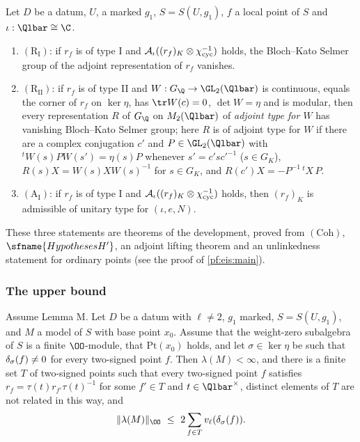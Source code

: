 \begin{definition}\label{pf:eis:rigstmts}
Let $D$ be a datum, $U$, a marked $g_1$, $S=S(U,g_1)$, $f$ a local point of $S$ and $\iota:\Qlbar\cong\C$.
\begin{enumerate}[label=(\alph*)]
\item $(\mathrm{R}_{\mathrm{I}})$: if $r_f$ is of type I and $\mathcal A_\iota((r_f)_K\otimes\chi_{\mathrm{cyc}}^{-1})$ holds, the Bloch--Kato Selmer group of
  the adjoint representation of $r_f$ vanishes.
\item $(\mathrm{R}_{\mathrm{II}})$: if $r_f$ is of type II and $W:G_\Q\to\GL_2(\Qlbar)$ is continuous, equals the corner of $r_f$ on
  $\ker\eta$, has $\tr W(c)=0$, $\det W=\eta$ and is modular, then every representation $R$ of $G_\Q$ on $M_2(\Qlbar)$ of
  \emph{adjoint type for $W$} has vanishing Bloch--Kato Selmer group; here $R$ is of adjoint type for $W$ if there are a
  complex conjugation $c'$ and $P\in\GL_2(\Qlbar)$ with ${}^tW(s)PW(s')=\eta(s)P$ whenever $s'=c'sc'^{-1}$ ($s\in G_K$),
  $R(s)X=W(s)XW(s)^{-1}$ for $s\in G_K$, and $R(c')X=-P^{-1}\,{}^tX\,P$.
\item $(\mathrm{A}_{\mathrm{I}})$: if $r_f$ is of type I and $\mathcal A_\iota((r_f)_K\otimes\chi_{\mathrm{cyc}}^{-1})$ holds, then $(r_f)_K$ is admissible of
  unitary type for $(\iota,e,N)$.
\end{enumerate}
\end{definition}

These three statements are theorems of the development, proved from $(\mathrm{Coh})$, $\sfname{HypothesesH'}$, an adjoint
lifting theorem and an unlinkedness statement for ordinary points (see the proof of \cref{pf:eis:main}).

\subsubsection{The upper bound}

\begin{lemma}\label{pf:eis:upper}
Assume Lemma M. Let $D$ be a datum with $\ell\ne2$, $g_1$ marked, $S=S(U,g_1)$, and $M$ a model of $S$ with base point $x_0$.
Assume that the weight-zero subalgebra of $S$ is a finite $\OO$-module, that $\mathrm{Pt}(x_0)$ holds, and let $\sigma\in\ker\eta$
be such that $\delta_\sigma(f)\ne0$ for every two-signed point $f$. Then $\lambda(M)<\infty$, and there is a finite set $T$ of
two-signed points such that every two-signed point $f$ satisfies $r_f=\tau(t)r_{f'}\tau(t)^{-1}$ for some $f'\in T$ and
$t\in\Qlbar^\times$, distinct elements of $T$ are not related in this way, and
\[
 \|\lambda(M)\|_\OO\ \le\ 2\sum_{f\in T}\eisv(\eistr_\sigma(f)).
\]
\end{lemma}

